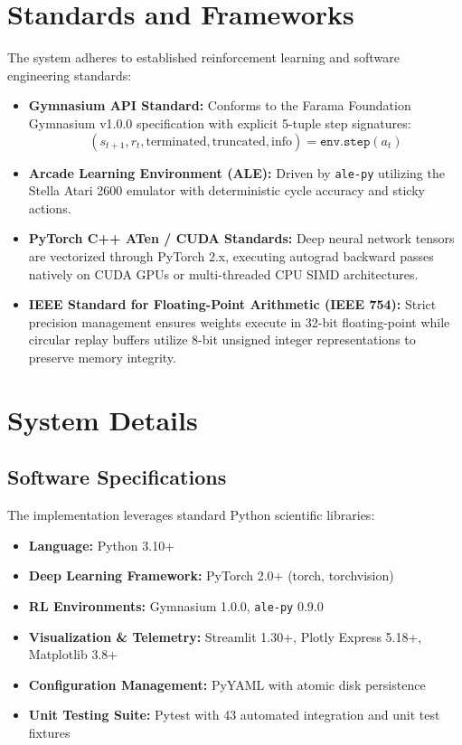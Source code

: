 \documentclass[12pt,a4paper]{report}
\begin{document}
\section{Standards and Frameworks}
The system adheres to established reinforcement learning and software engineering standards:
\begin{itemize}
    \item \textbf{Gymnasium API Standard:} Conforms to the Farama Foundation Gymnasium v1.0.0 specification with explicit 5-tuple step signatures:
    \begin{equation}
        (s_{t+1}, r_t, \text{terminated}, \text{truncated}, \text{info}) = \texttt{env.step}(a_t)
    \end{equation}
    \item \textbf{Arcade Learning Environment (ALE):} Driven by \texttt{ale-py} utilizing the Stella Atari 2600 emulator with deterministic cycle accuracy and sticky actions.
    \item \textbf{PyTorch C++ ATen / CUDA Standards:} Deep neural network tensors are vectorized through PyTorch 2.x, executing autograd backward passes natively on CUDA GPUs or multi-threaded CPU SIMD architectures.
    \item \textbf{IEEE Standard for Floating-Point Arithmetic (IEEE 754):} Strict precision management ensures weights execute in 32-bit floating-point while circular replay buffers utilize 8-bit unsigned integer representations to preserve memory integrity.
\end{itemize}

\section{System Details}

\subsection{Software Specifications}
The implementation leverages standard Python scientific libraries:
\begin{itemize}
    \item \textbf{Language:} Python 3.10+
    \item \textbf{Deep Learning Framework:} PyTorch 2.0+ (torch, torchvision)
    \item \textbf{RL Environments:} Gymnasium 1.0.0, \texttt{ale-py} 0.9.0
    \item \textbf{Visualization \& Telemetry:} Streamlit 1.30+, Plotly Express 5.18+, Matplotlib 3.8+
    \item \textbf{Configuration Management:} PyYAML with atomic disk persistence
    \item \textbf{Unit Testing Suite:} Pytest with 43 automated integration and unit test fixtures
\end{itemize}
\end{document}
